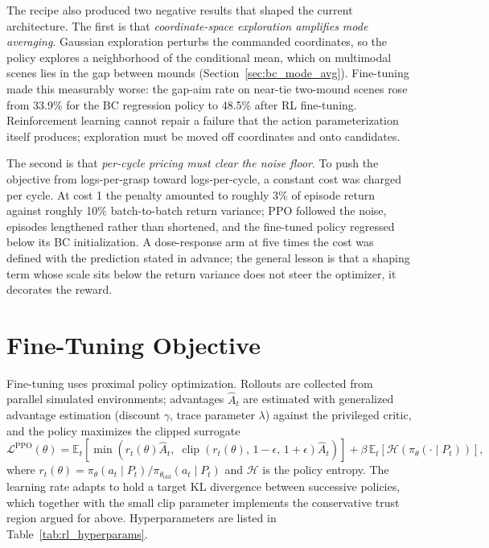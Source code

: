 The recipe also produced two negative results that shaped the current
architecture. The first is that \emph{coordinate-space exploration amplifies
mode averaging}. Gaussian exploration perturbs the commanded coordinates, so
the policy explores a neighborhood of the conditional mean, which on
multimodal scenes lies in the gap between mounds
(Section~\ref{sec:bc_mode_avg}). Fine-tuning made this measurably worse: the
gap-aim rate on near-tie two-mound scenes rose from 33.9\% for the BC
regression policy to 48.5\% after RL fine-tuning. Reinforcement learning
cannot repair a failure that the action parameterization itself produces;
exploration must be moved off coordinates and onto candidates.

The second is that \emph{per-cycle pricing must clear the noise floor}. To
push the objective from logs-per-grasp toward logs-per-cycle, a constant
cost was charged per cycle. At cost 1 the penalty amounted to roughly 3\% of
episode return against roughly 10\% batch-to-batch return variance; PPO
followed the noise, episodes lengthened rather than shortened, and the
fine-tuned policy regressed below its BC initialization. A dose-response arm
at five times the cost was defined with the prediction stated in advance;
the general lesson is that a shaping term whose scale sits below the return
variance does not steer the optimizer, it decorates the reward.

\section{Fine-Tuning Objective}
\label{sec:rl_ppo}

Fine-tuning uses proximal policy optimization. Rollouts are collected from
parallel simulated environments; advantages $\hat{A}_t$ are estimated with
generalized advantage estimation (discount $\gamma$, trace parameter
$\lambda$) against the privileged critic, and the policy maximizes the
clipped surrogate
\begin{equation}
  \mathcal{L}^{\mathrm{PPO}}(\theta) = \mathbb{E}_t \left[
    \min\!\left( r_t(\theta) \hat{A}_t,\;
    \operatorname{clip}\!\left(r_t(\theta),\, 1 - \epsilon,\, 1 + \epsilon\right)
    \hat{A}_t \right) \right]
  + \beta \, \mathbb{E}_t\!\left[ \mathcal{H}\!\left( \pi_\theta(\cdot \mid P_t) \right) \right],
  \label{eq:ppo}
\end{equation}
where $r_t(\theta) = \pi_\theta(a_t \mid P_t) / \pi_{\theta_{\mathrm{old}}}(a_t \mid P_t)$
and $\mathcal{H}$ is the policy entropy. The learning rate adapts to hold a
target KL divergence between successive policies, which together with the
small clip parameter implements the conservative trust region argued for
above. Hyperparameters are listed in Table~\ref{tab:rl_hyperparams}.

